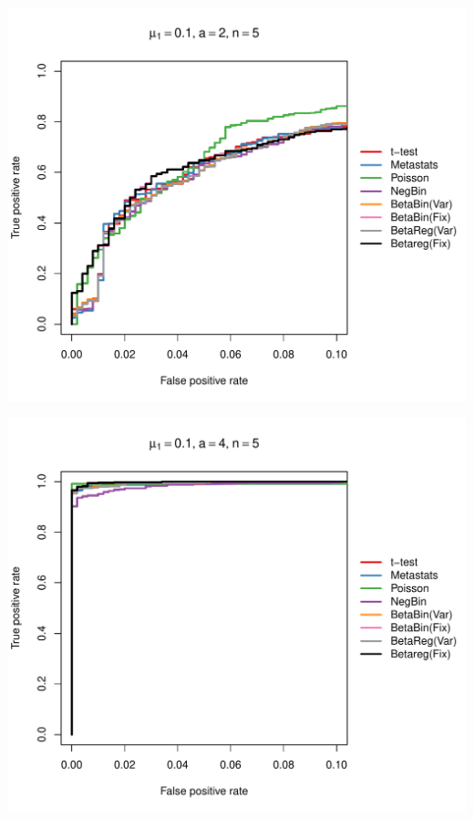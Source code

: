 \documentclass[12pt]{article}\usepackage{graphicx, color}
\makeatletter
\def\maxwidth{ %
  \ifdim\Gin@nat@width>\linewidth
    \linewidth
  \else
    \Gin@nat@width
  \fi
}
\newenvironment{knitrout}{}{} %
\makeatother
\begin{document}
\begin{knitrout}
{\centering \includegraphics[width=\maxwidth]{figure/rocs5} 

}




{\centering \includegraphics[width=\maxwidth]{figure/rocs6} 

}





\end{knitrout}
\end{document}
